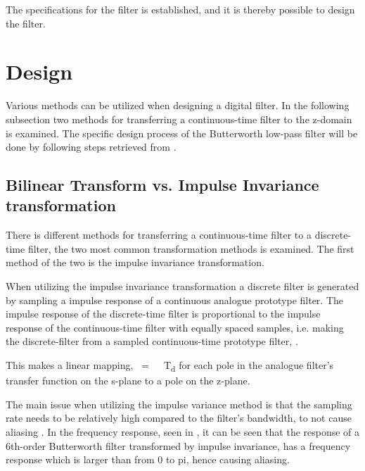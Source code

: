 The specifications for the filter is established, and it is thereby possible to design the filter.

\section{Design}
Various methods can be utilized when designing a digital filter. In the following subsection two methods for transferring a continuous-time filter to the z-domain is examined. The specific design process of the Butterworth low-pass filter will be done by following steps retrieved from \cite{AVOppenheim}.

\subsection{Bilinear Transform vs. Impulse Invariance transformation}
There is different methods for transferring a continuous-time filter to a discrete-time filter, the two most common transformation methods is examined. The first method of the two is the impulse invariance transformation.

When utilizing the impulse invariance transformation a discrete filter is generated by sampling a impulse response of a continuous analogue prototype filter. The impulse response of the discrete-time filter is proportional to the impulse response of the continuous-time filter with equally spaced samples, i.e.  making the discrete-filter from a sampled continuous-time prototype filter, \cite{AVOppenheim}.

This makes a linear mapping, \si{\omega = \Omega \cdot T_d} for each pole in the analogue filter's transfer function on the s-plane to a pole on the z-plane. 

The main issue when utilizing the impulse variance method is that the sampling rate needs to be relatively high compared to the filter's bandwidth, to not cause aliasing \cite{LyonsR.G}. In the frequency response, seen in , it can be seen that the response of a 6th-order Butterworth filter transformed by impulse invariance, has a frequency response which is larger than from 0 to \si{pi}, hence causing aliasing.

